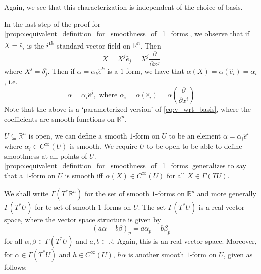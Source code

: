 \documentclass[notoc,notitlepage]{tufte-book}
\begin{document}
\begin{remark}
  Again, we see that this characterization is independent of the choice of basis.
\end{remark}

\begin{note}
  In the last step of the proof for \cref{propo:equivalent_definition_for_smoothness_of_1_forms},
  we observe that if $X = \hat{e}_i$ is the $i$\textsuperscript{th} standard vector field on
  $\mathbb{R}^n$. Then
  \begin{equation*}
    X = X^j \hat{e}_j = X^j \frac{\partial}{\partial x^j}
  \end{equation*}
  where $X^j = \delta^{i}_j$. Then if $\alpha = \alpha_k \hat{e}^k$ is a $1$-form, we have that
  $\alpha(X) = \alpha(\hat{e}_i) = \alpha_i$, i.e.
  \begin{equation}\label{eq:1_forms_with_coefficients_as_differentials}
    \alpha = \alpha_i \hat{e}^j, \text{ where } \alpha_i = \alpha(\hat{e}_i)
      = \alpha \left( \frac{\partial}{\partial x^i} \right)
  \end{equation}
  Note that the above is a `parameterized version' of \cref{eq:v_wrt_basis}, where the coefficients
  are smooth functions on $\mathbb{R}^n$.
\end{note}

 $U \subseteq \mathbb{R}^n$ is open, we can define a smooth $1$-form on $U$ to
be an element $\alpha = \alpha_i \hat{e}^i$ where $\alpha_i \in C^\infty(U)$ is smooth. We require
$U$ to be open to be able to define smoothness at all points of $U$. \cref{propo:equivalent_definition_for_smoothness_of_1_forms} generalizes
to say that a $1$-form on $U$ is smooth iff $\alpha(X) \in C^\infty(U)$ for all $X \in \Gamma(TU)$.

We shall write $\Gamma(T^* \mathbb{R}^n)$ for the set of smooth $1$-forms on $\mathbb{R}^n$ and
more generally $\Gamma(T^* U)$ for te set of smooth $1$-forms on $U$. The set $\Gamma(T^* U)$ is a
real vector space, where the vector space structure is given by
\begin{equation*}
  (a \alpha + b \beta)_p = a \alpha_p + b \beta_p
\end{equation*}
for all $\alpha, \beta \in \Gamma(T^* U)$ and $a, b \in \mathbb{R}$. Again, this is an
 real vector space. Moreover, for $\alpha \in \Gamma(T^* U)$ and
$h \in C^\infty(U)$, $h\alpha$ is another smooth $1$-form on $U$, given as follows:
\end{document}
